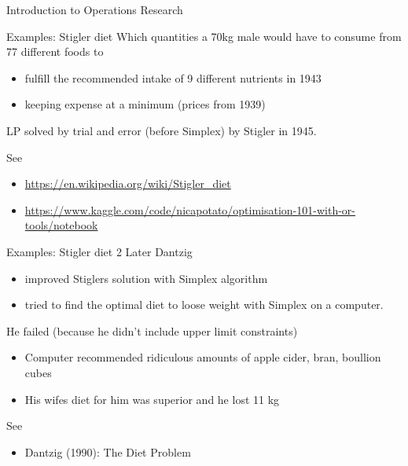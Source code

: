 \documentclass[
  ignorenonframetext,
]{beamer}
\providecommand{\tightlist}{%
  \setlength{\itemsep}{0pt}\setlength{\parskip}{0pt}}\usepackage{longtable,booktabs,array}
\begin{document}
\begin{frame}{Introduction to Operations Research}
\begin{block}{Examples: Stigler diet}
\protect\hypertarget{examples-stigler-diet}{}
Which quantities a 70kg male would have to consume from 77 different
foods to

\begin{itemize}
\tightlist
\item
  fulfill the recommended intake of 9 different nutrients in 1943
\item
  keeping expense at a minimum (prices from 1939)
\end{itemize}

LP solved by trial and error (before Simplex) by Stigler in 1945.

See

\begin{itemize}
\tightlist
\item
  \url{https://en.wikipedia.org/wiki/Stigler_diet}
\item
  \url{https://www.kaggle.com/code/nicapotato/optimisation-101-with-or-tools/notebook}
\end{itemize}
\end{block}

\begin{block}{Examples: Stigler diet 2}
\protect\hypertarget{examples-stigler-diet-2}{}
Later Dantzig

\begin{itemize}
\tightlist
\item
  improved Stiglers solution with Simplex algorithm
\item
  tried to find the optimal diet to loose weight with Simplex on a
  computer.
\end{itemize}

He failed (because he didn't include upper limit constraints)

\begin{itemize}
\tightlist
\item
  Computer recommended ridiculous amounts of apple cider, bran, boullion
  cubes
\item
  His wifes diet for him was superior and he lost 11 kg
\end{itemize}

See

\begin{itemize}
\tightlist
\item
  Dantzig (1990): The Diet Problem
\end{itemize}
\end{block}


\end{frame}
\end{document}
